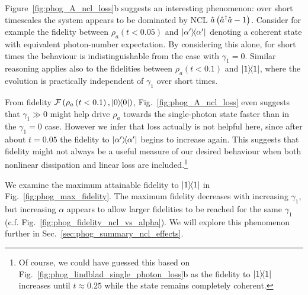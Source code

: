 Figure~\ref{fig:phog_A_ncl_loss}b suggests an interesting phenomenon: over short timescales the system appears to be dominated by NCL $\hat{a}\left(\hat{a}^\dagger \hat{a} - 1\right)$. Consider for example the fidelity between $\rho_a\left(t < 0.05\right)$ and $\dyad{\alpha^\prime}$ denoting a coherent state with equivalent photon-number expectation. By considering this alone, for short times the behaviour is indistinguishable from the case with $\gamma_1 = 0$. Similar reasoning applies also to the fidelities between $\rho_a\left(t < 0.1\right)$ and $\dyad{1}$, where the evolution is practically independent of $\gamma_1$ over short times.

From fidelity $\mathcal{F}\left( \rho_a\left(t<0.1\right), \dyad{0}\right)$, Fig.~\ref{fig:phog_A_ncl_loss} even suggests that $\gamma_1 \gg 0$ might help drive $\rho_a$ towards the single-photon state faster than in the $\gamma_1 = 0$ case. However we infer that loss actually is not helpful here, since after about $t=0.05$ the fidelity to $\dyad{\alpha^\prime}$ begins to increase again. This suggests that fidelity might not always be a useful measure of our desired behaviour when both nonlinear dissipation and linear loss are included.\footnote{Of course, we could have guessed this based on Fig.~\ref{fig:phog_lindblad_single_photon_loss}b as the fidelity to $\dyad{1}$ increases until $t\approx 0.25$ while the state remains completely coherent.}

We examine the maximum attainable fidelity to $\dyad{1}$ in Fig.~\ref{fig:phog_max_fidelity}. The maximum fidelity decreases with increasing $\gamma_1$, but increasing $\alpha$ appears to allow larger fidelities to be reached for the same $\gamma_1$ (c.f. Fig.~\ref{fig:phog_fidelity_ncl_vs_alpha}). We will explore this phenomenon further in Sec.~\ref{sec:phog_summary_ncl_effects}.


